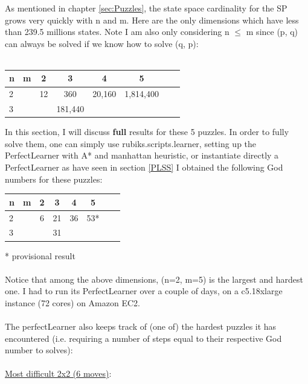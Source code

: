 As mentioned in chapter \ref{sec:Puzzles}, the state space cardinality for the SP grows very quickly with n and m. Here are the only dimensions which have less than 239.5 millions states. Note I am also only considering n $\leq$ m since (p, q) can always be solved if we know how to solve (q, p):
\\
\\
\begin{center}
\begin{tabular}{l*{6}{c}r}
n              & m & 2 & 3 & 4 & 5\\
\hline
2              &   & 12 & 360 & 20,160 & 1,814,400 \\
3              &   &   & 181,440 &  &    \\
\end{tabular}
\end{center}
In this section, I will discuss \textbf{full} results for these 5 puzzles. In order to fully solve them, one can simply use rubiks.scripts.learner, setting up the PerfectLearner with A* and manhattan heuristic, or instantiate directly a PerfectLearner as have seen in section \ref{PLSS}
I obtained the following God numbers for these puzzles:
\begin{center}
\begin{tabular}{l*{6}{c}r}
n              & m & 2 & 3 & 4 & 5\\
\hline
2              &   & 6 & 21 & 36 & 53* \\
3              &   &   & 31 &  &    \\
\end{tabular}
\end{center}
* provisional result
\\
\\
Notice that among the above dimensions, (n=2, m=5) is the largest and hardest one. I had to run its PerfectLearner over a couple of days, on a c5.18xlarge instance (72 cores) on Amazon EC2.
\\
\\
The perfectLearner also keeps track of (one of) the hardest puzzles it has encountered (i.e. requiring a number of steps equal to their respective God number to solves):
\\
\\
\underline{Most difficult 2x2 (6 moves)}:
\begin{center}
\begin{three}
\end{three}
\end{center}
